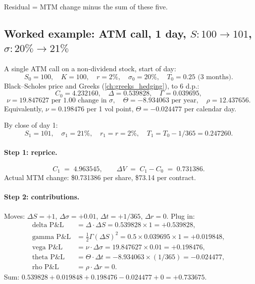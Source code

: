 Residual = MTM change minus the sum of these five.

\subsection{Worked example: ATM call, 1 day, $S{:}100\!\to\!101$,
$\sigma{:}20\%\!\to\!21\%$}
\label{sec:explain_worked}

A single ATM call on a non-dividend stock, start of day:
\[
  S_0 = 100, \quad K = 100, \quad r = 2\%, \quad \sigma_0 = 20\%,
  \quad T_0 = 0.25 \text{ (3 months)}.
\]
Black--Scholes price and Greeks (\cref{ch:greeks_hedging}), to 6
d.p.:
\[
  C_0 = 4.232160, \quad
  \Delta = 0.539828, \quad
  \Gamma = 0.039695,
\]
\[
  \nu = 19.847627 \text{ per 1.00 change in } \sigma, \quad
  \Theta = -8.934063 \text{ per year}, \quad
  \rho = 12.437656.
\]
Equivalently, $\nu = 0.198476$ per 1 vol point, $\Theta = -0.024477$
per calendar day.

By close of day 1:
\[
  S_1 = 101, \quad \sigma_1 = 21\%, \quad r_1 = r = 2\%,
  \quad T_1 = T_0 - 1/365 = 0.247260.
\]

\paragraph{Step 1: reprice.}
\[
  C_1 \;=\; 4.963545, \qquad
  \Delta V \;=\; C_1 - C_0 \;=\; 0.731386.
\]
Actual MTM change: \$0.731386 per share, \$73.14 per contract.

\paragraph{Step 2: contributions.}  Moves:
$\Delta S = +1$, $\Delta \sigma = +0.01$, $\Delta t = +1/365$,
$\Delta r = 0$.  Plug in:
\begin{align*}
  \text{delta P\&L} &= \Delta \cdot \Delta S
     = 0.539828 \times 1 = +0.539828, \\
  \text{gamma P\&L} &= \tfrac{1}{2}\Gamma (\Delta S)^2
     = 0.5 \times 0.039695 \times 1 = +0.019848, \\
  \text{vega P\&L} &= \nu \cdot \Delta \sigma
     = 19.847627 \times 0.01 = +0.198476, \\
  \text{theta P\&L} &= \Theta \cdot \Delta t
     = -8.934063 \times (1/365) = -0.024477, \\
  \text{rho P\&L} &= \rho \cdot \Delta r = 0.
\end{align*}
Sum: $0.539828 + 0.019848 + 0.198476 - 0.024477 + 0 = +0.733675$.


